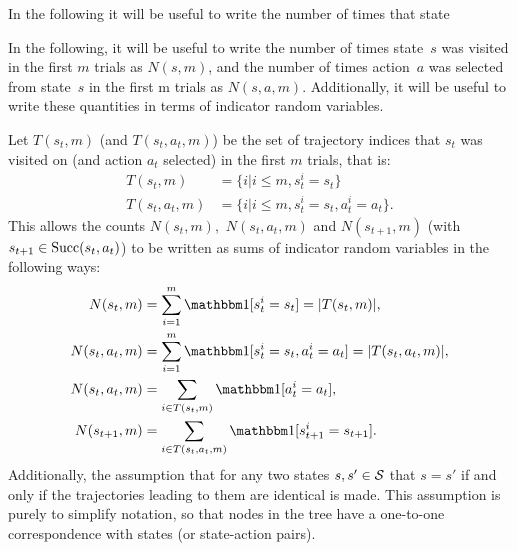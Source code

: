         
        In the following it will be useful to write the number of times that state


        In the following, it will be useful to write the number of times state~$s$ was visited in the first $m$ trials as $N(s,m)$, and the number of times action~$a$ was selected from state~$s$ in the first m trials as $N(s,a,m).$ Additionally, it will be useful to write these quantities in terms of indicator random variables. 
        
        Let $T(s_t,m)$ (and $T(s_t,a_t,m)$) be the set of trajectory indices that $s_t$ was visited on (and action $a_t$ selected) in the first $m$ trials, that is:
        \begin{align}
            T(s_t,m) &= \{i | i\leq m, s^i_t = s_t \} \\
            T(s_t,a_t,m) &= \{i | i\leq m, s^i_t = s_t, a^i_t = a_t \}.
        \end{align}
        This allows the counts $N(s_t,m),$ $N(s_t,a_t,m)$ and $N(s_{t+1},m)$ (with $s_{t+1}\in{\textnormal{Succ}(s_t,a_t)}$) to be written as sums of indicator random variables in the following ways:
        \begin{align}
            N(s_t,m) &= \sum_{i=1}^m \one[s^i_t=s_t] = |T(s_t,m)|, \\
            N(s_t,a_t,m) &= \sum_{i=1}^m \one[s^i_t=s_t,a^i_t=a_t] = |T(s_t,a_t,m)|, \\ 
            N(s_t,a_t,m) &= \sum_{i\in T(s_t,m)} \one[a^i_t = a_t], \label{appeq:nsa_sum} \\
            N(s_{t+1},m) &= \sum_{i\in T(s_t,a_t,m)} \one[s^i_{t+1} = s_{t+1}]. \label{appeq:ns_sum}
        \end{align}
        Additionally, the assumption that for any two states $s,s'\in\mathcal{S}$ that $s=s'$ if and only if the trajectories leading to them are identical is made. This assumption is purely to simplify notation, so that nodes in the tree have a one-to-one correspondence with states (or state-action pairs). 
        
